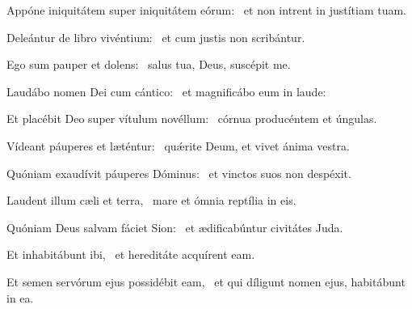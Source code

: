 \item Appóne iniquitátem super iniquitátem eórum:~\psstar{} et non intrent in justítiam tuam.

\item Deleántur de libro vivénti\-um:~\psstar{} et cum justis non scribántur.

\item Ego sum pauper et dolens:~\psstar{} salus tua, Deus, suscépit me.

\item Laudábo nomen Dei cum cántico:~\psstar{} et magnificábo eum in laude:

\item Et placébit Deo super vítulum novéllum:~\psstar{} córnua producéntem et úngulas.

\item Vídeant páuperes et lætén\-tur:~\psstar{} quǽrite Deum, et vivet ánima vestra.

\item Quóniam exaudívit páuperes Dóminus:~\psstar{} et vinctos suos non despéxit.

\item Laudent illum cæli et terra,~\psstar{} mare et ómnia reptília in eis.

\item Quóniam Deus salvam fáciet Sion:~\psstar{} et ædificabúntur civitátes Juda.

\item Et inhabitábunt ibi,~\psstar{} et hereditáte acquírent eam.

\item Et semen servórum ejus possidébit eam,~\psstar{} et qui díligunt nomen ejus, habitábunt in ea.

